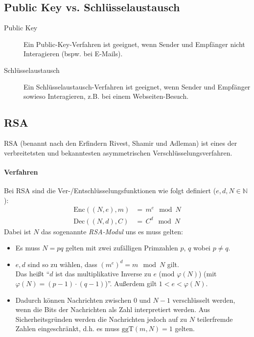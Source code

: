 \documentclass[a4paper, 11pt, accentcolor = tud3b]{tudreport}
\newcommand{\Enc}{\ensuremath{\textrm{Enc}}}
\newcommand{\Dec}{\ensuremath{\textrm{Dec}}}
\newcommand{\ggT}{\ensuremath{\textrm{ggT}}}
\begin{document}
            \subsection{Public Key vs. Schlüsselaustausch}
                \begin{description}
                	\item[Public Key] Ein Public-Key-Verfahren ist geeignet, wenn Sender und Empfänger nicht Interagieren (bspw. bei E-Mails).
                	\item[Schlüsselaustausch] Ein Schlüsselaustausch-Verfahren ist geeignet, wenn Sender und Empfänger sowieso Interagieren, z.B. bei einem Webseiten-Besuch.
                \end{description}

            \subsection{RSA}
                RSA (benannt nach den Erfindern Rivest, Shamir und Adleman) ist eines der verbreitetsten und bekanntesten asymmetrischen Verschlüsselungsverfahren.

				\paragraph{Verfahren}
					Bei RSA sind die Ver-/Entschlüsselungsfunktionen wie folgt definiert (\( e, d, N \in \mathbb{N} \)):
					\begin{align*}
						\Enc((N, e), m) &=\, m ^ e \mod N \\
						\Dec((N, d), C) &=\, C ^ d \mod N
					\end{align*}
					Dabei ist \(N\) das sogenannte \textit{RSA-Modul} uns es muss gelten:
					\begin{itemize}
						\item Es muss \( N = pq \) gelten mit zwei zufälligen Primzahlen \( p \), \( q \) wobei \( p \neq q \).
						\item \( e, d \) sind so zu wählen, dass \( (m ^ e) ^ d = m \mod N \) gilt. \\ Das heißt \enquote{\(d\) ist das multiplikative Inverse zu \( e \) (\( \textrm{mod } \varphi(N) \)) (mit \( \varphi(N) = (p - 1) \cdot (q - 1) \))}. Außerdem gilt \( 1 < e < \varphi(N) \).
						\item Dadurch können Nachrichten zwischen \( 0 \) und \( N - 1 \) verschlüsselt werden, wenn die Bits der Nachrichten als Zahl interpretiert werden. Aus Sicherheitsgründen werden die Nachrichten jedoch auf zu \(N\) teilerfremde Zahlen eingeschränkt, d.h. es muss \( \ggT(m, N) = 1 \) gelten.
					\end{itemize}
				
\end{document}
